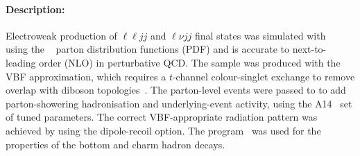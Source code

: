 \paragraph{Description:}

Electroweak production of \(\ell\ell jj\) and \(\ell\nu jj\) final states
was simulated with 
\POWHEGBOX[v2]~\cite{Frixione:2007nw,Nason:2004rx,Frixione:2007vw,Alioli:2010xd}
using the \NNPDF[3.0nlo]~\cite{Ball:2014uwa} parton distribution functions (PDF)
and is accurate to next-to-leading order (NLO) in perturbative QCD. The sample was produced with
the VBF approximation, which requires a $t$-channel colour-singlet exchange to remove overlap with
diboson topologies~\cite{Jager:2012xk,Schissler:2013nga}. The parton-level events were passed to \PYTHIA[8.245] 
to add parton-showering hadronisation and underlying-event activity, using the A14~\cite{ATL-PHYS-PUB-2014-021} 
set of tuned parameters. 
The correct VBF-appropriate radiation pattern was achieved by using the dipole-recoil option.
The \EVTGEN[1.7.0] program~\cite{Lange:2001uf} was used for the properties of the bottom and charm hadron decays.


